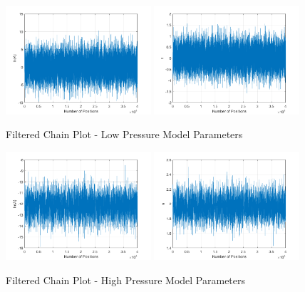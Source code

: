 \documentclass{article}
\begin{document}
\begin{figure}[htb]
\centering
\includegraphics[width=0.48\textwidth]{FilteredChain_lnA_LP.png}
\includegraphics[width=0.48\textwidth]{FilteredChain_n_LP.png}
\caption{Filtered Chain Plot - Low Pressure Model Parameters}
\label{LPChain}
\end{figure}

\begin{figure}[htb]
\centering
\includegraphics[width=0.48\textwidth]{FilteredChain_lnA_HP.png}
\includegraphics[width=0.48\textwidth]{FilteredChain_n_HP.png}
\caption{Filtered Chain Plot - High Pressure Model Parameters}
\label{HPChain}
\end{figure}
\end{document}
